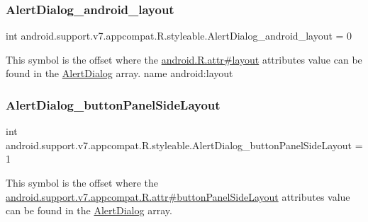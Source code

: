\subsubsection{\texorpdfstring{Alert\+Dialog\+\_\+android\+\_\+layout}{AlertDialog\_android\_layout}}
{\footnotesize\ttfamily int android.\+support.\+v7.\+appcompat.\+R.\+styleable.\+Alert\+Dialog\+\_\+android\+\_\+layout = 0\hspace{0.3cm}{\ttfamily [static]}}

This symbol is the offset where the \hyperlink{}{android.\+R.\+attr\#layout} attribute\textquotesingle{}s value can be found in the \hyperlink{classandroid_1_1support_1_1v7_1_1appcompat_1_1R_1_1styleable_a52dcd4f818920ef336f5b8033a2b34c1}{Alert\+Dialog} array.  name android\+:layout \mbox{\label{classandroid_1_1support_1_1v7_1_1appcompat_1_1R_1_1styleable_ad40086bf4aa954bd7f5c4091ac88c6b1}} 
\subsubsection{\texorpdfstring{Alert\+Dialog\+\_\+button\+Panel\+Side\+Layout}{AlertDialog\_buttonPanelSideLayout}}
{\footnotesize\ttfamily int android.\+support.\+v7.\+appcompat.\+R.\+styleable.\+Alert\+Dialog\+\_\+button\+Panel\+Side\+Layout = 1\hspace{0.3cm}{\ttfamily [static]}}

This symbol is the offset where the \hyperlink{classandroid_1_1support_1_1v7_1_1appcompat_1_1R_1_1attr_adf77db2087554bf02805ea33fde73d79}{android.\+support.\+v7.\+appcompat.\+R.\+attr\#button\+Panel\+Side\+Layout} attribute\textquotesingle{}s value can be found in the \hyperlink{classandroid_1_1support_1_1v7_1_1appcompat_1_1R_1_1styleable_a52dcd4f818920ef336f5b8033a2b34c1}{Alert\+Dialog} array.

